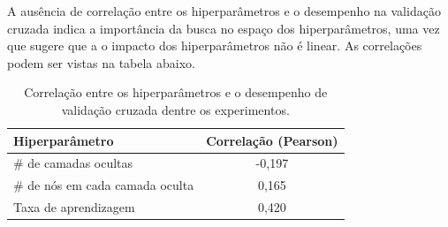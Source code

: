 \documentclass[a4paper,11pt]{article}
\begin{document}
A ausência de correlação entre os hiperparâmetros e o desempenho na validação cruzada indica a importância da busca no espaço dos hiperparâmetros, uma vez que sugere que a o impacto dos hiperparâmetros não é linear. As correlações podem ser vistas na tabela abaixo.

\begin{table}[H]
    \centering
    \begin{tabular}{l | c}
	Hiperparâmetro & Correlação (Pearson) \\
	\hline
	\# de camadas ocultas & -0,197 \\
	\# de nós em cada camada oculta & 0,165 \\
	Taxa de aprendizagem & 0,420
    \end{tabular}
    \caption{Correlação entre os hiperparâmetros e o desempenho de validação cruzada dentre os experimentos.}
    \label{tab:label}
\end{table}
\end{document}
